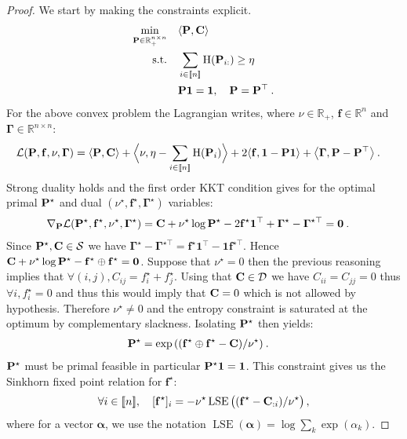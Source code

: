 \begin{proof}
We start by making the constraints explicit.
\begin{align}
    \min_{\mathbf{P} \in \mathbb{R}_+^{n \times n}} \quad &\langle \mathbf{P}, \mathbf{C} \rangle \\
    \text{s.t.} \quad &\sum_{i \in {[\![n]\!]}} \operatorname{H}(\mathbf{P}_{i:}) \geq \eta \\
    & \mathbf{P} \bm{1} = \bm{1}, \quad \mathbf{P} = \mathbf{P}^\top \:.
\end{align}
For the above convex problem the Lagrangian writes, where $\nu \in \mathbb{R}_+$, $\mathbf{f} \in \mathbb{R}^n$ and $\bm{\Gamma} \in \mathbb{R}^{n \times n}$:
\begin{align}
    \mathcal{L}(\mathbf{P}, \mathbf{f}, \nu, \bm{\Gamma}) &= \langle \mathbf{P}, \mathbf{C} \rangle + \Big\langle \nu, \eta - \sum_{i \in {[\![n]\!]}} \operatorname{H}(\mathbf{P}_i) \Big\rangle + 2\langle \mathbf{f}, \bm{1} - \mathbf{P} \bm{1} \rangle + \big\langle \bm{\Gamma}, \mathbf{P} - \mathbf{P}^\top \big\rangle \:.
\end{align}
Strong duality holds and the first order KKT condition gives for the optimal primal $\mathbf{P}^\star$ and dual $(\nu^\star, \mathbf{f}^\star, \bm{\Gamma}^\star)$ variables: 
\begin{align}
    \nabla_{\mathbf{P}} \mathcal{L}(\mathbf{P}^\star, \mathbf{f}^\star, \nu^\star, \bm{\Gamma}^\star) &= \mathbf{C} + \nu^\star \log{\mathbf{P}^\star} - 2\mathbf{f}^\star \bm{1}^\top + \bm{\Gamma}^\star - \bm{\Gamma}^{\star\top} = \bm{0} \:.
\end{align}
Since $\mathbf{P}^\star, \mathbf{C} \in \mathcal{S}$ we have $\bm{\Gamma}^\star - \bm{\Gamma}^{\star\top} = \mathbf{f}^\star \bm{1}^\top - \bm{1}\mathbf{f}^{\star \top}$. Hence $\mathbf{C} + \nu^\star \log{\mathbf{P}^\star} - \mathbf{f}^\star \oplus \mathbf{f}^\star = \bm{0}$. Suppose that $\nu^\star = 0$ then the previous reasoning implies that $\forall (i,j), C_{ij} = f_i^\star + f_j^\star$. Using that $\mathbf{C} \in \mathcal{D}$ we have $C_{ii} = C_{jj} = 0$ thus $\forall i,  f^\star_i = 0$ and thus this would imply that $\mathbf{C} = 0$ which is not allowed by hypothesis. Therefore $\nu^\star \neq 0$ and the entropy constraint is saturated at the optimum by complementary slackness. Isolating $\mathbf{P}^\star$ then yields:
\begin{align}
    \mathbf{P}^{\star} &= \exp{\left( (\mathbf{f}^\star \oplus \mathbf{f}^{\star} - \mathbf{C}) / \nu^\star \right)} \:.
\end{align}
$\mathbf{P}^\star$ must be primal feasible in particular $\mathbf{P}^\star \bm{1} = \bm{1}$. This constraint gives us the Sinkhorn fixed point relation for $\mathbf{f}^\star$:
\begin{align}
    \forall i \in {[\![n]\!]}, \quad [\mathbf{f}^\star]_i = - \nu^\star \operatorname{LSE} \big((\mathbf{f}^\star - \mathbf{C}_{:i}) / \nu^\star \big)\,,
\end{align}
where for a vector $\bm{\alpha}$, we use the notation
$\operatorname{LSE}(\bm{\alpha}) = \log \sum_{k} \exp (\alpha_k)$.
\end{proof}


